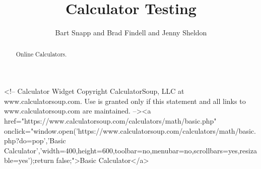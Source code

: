 \documentclass[nooutcomes]{ximera}
\title{Calculator Testing}
\author{Bart Snapp and Brad Findell and Jenny Sheldon}
\begin{document}
\begin{abstract}
Online Calculators.
\end{abstract}
\maketitle

\begin{javascript}
<!-- Calculator Widget Copyright CalculatorSoup, LLC at www.calculatorsoup.com. Use is granted only if this statement and all links to www.calculatorsoup.com are maintained. --><a href="https://www.calculatorsoup.com/calculators/math/basic.php" onclick="window.open('https://www.calculatorsoup.com/calculators/math/basic.php?do=pop','Basic Calculator','width=400,height=600,toolbar=no,menubar=no,scrollbars=yes,resizable=yes');return false;">Basic Calculator</a>
\end{javascript}
\end{document}
